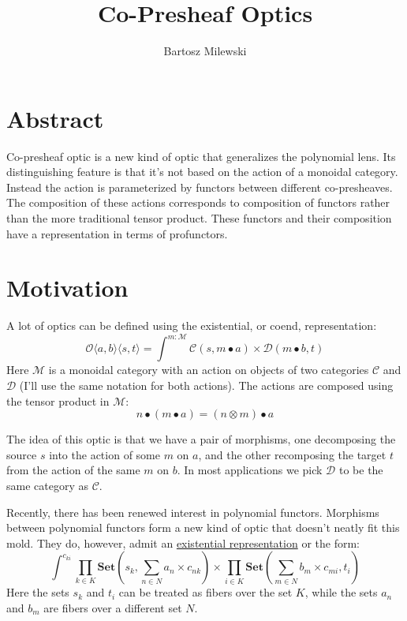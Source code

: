 \documentclass[11pt]{amsart}
\author{Bartosz Milewski}
\title{Co-Presheaf Optics}
\newcommand{\cat}[1]{\mathcal{#1}}%
\begin{document}
\maketitle{}

\section{Abstract}

Co-presheaf optic is a new kind of optic that generalizes the polynomial lens. Its distinguishing feature is that it's not based on the action of a monoidal category. Instead the action is parameterized by functors between different co-presheaves. The composition of these actions corresponds to composition of functors rather than the more traditional tensor product. These functors and their composition have a representation in terms of profunctors. 

\section{Motivation}

A lot of optics can be defined using the existential, or coend, representation:
\[ \mathcal{O}\langle a, b\rangle \langle s, t \rangle = \int^{m \colon \cat M} \cat C (s, m \bullet a) \times \cat D ( m \bullet b, t) \]
Here $\cat M$ is a monoidal category with an action on objects of two categories $\cat C$ and $\cat D$ (I'll use the same notation for both actions). The actions are composed using the tensor product in $\cat M$:
\[ n \bullet (m \bullet a) = (n \otimes m) \bullet a \]

The idea of this optic is that we have a pair of morphisms, one decomposing the source $s$ into the action of some $m$ on $a$, and the other recomposing the target $t$ from the action of the same $m$ on $b$. In most applications we pick $\cat D$ to be the same category as $\cat C$.

Recently, there has been renewed interest in polynomial functors. Morphisms between polynomial functors form a new kind of optic that doesn't neatly fit this mold. They do, however, admit an \href{https://bartoszmilewski.com/2021/12/07/polylens/}{existential representation} or the form:
\[ \int^{c_{k i}} 
 \prod_{k \in K} \mathbf{Set} \left(s_k,  \sum_{n \in N} a_n \times c_{n k} \right) \times 
 \prod_{i \in K}  \mathbf{Set} \left(\sum_{m \in N} b_m \times c_{m i}, t_i \right) \]
Here the sets $s_k$ and $t_i$ can be treated as fibers over the set $K$, while the sets $a_n$ and $b_m$ are fibers over a different set $N$. 
\end{document}
